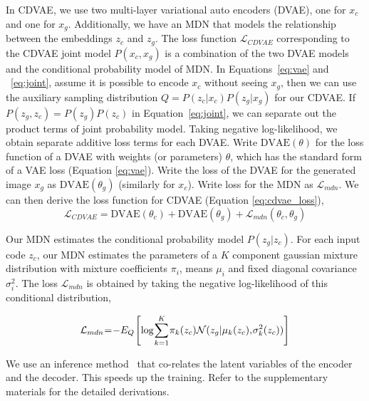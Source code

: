 \documentclass[10pt,twocolumn,letterpaper]{article}
\begin{document}
In CDVAE, we use two multi-layer variational auto encoders (DVAE), one for $x_c$ and one 
for $x_g$. Additionally, we have an MDN that models the relationship between the embeddings
$z_c$ and $z_g$. The loss function $\mathcal{L}_{CDVAE}$ corresponding to the CDVAE joint model $P(x_{c}, x_{g})$ 
is a combination of the two DVAE models and the conditional probability model of MDN. 
In Equations~\ref{eq:vae} and ~\ref{eq:joint}, 
assume it is possible to encode $x_c$ without seeing $x_g$, then we can use the auxiliary 
sampling distribution $Q=P(z_c|x_c)P(z_g|x_g)$ for our CDVAE. If $P(z_g, z_c)=P(z_g) P(z_c)$ 
in Equation~\ref{eq:joint}, we can separate out the product terms of joint probability 
model. Taking negative log-likelihood, we obtain separate additive loss terms for each 
DVAE. Write $\mbox{DVAE}(\theta)$ for the loss function of a DVAE with weights
(or parameters) $\theta$, which has the standard form of a VAE loss (Equation \ref{eq:vae}). 
Write the loss of the DVAE for the generated image $x_g$ as $\mbox{DVAE}(\theta_g)$ 
(similarly for $x_c$). Write loss for the MDN as $\mathcal{L}_{mdn}$. We can then derive the 
loss function for CDVAE (Equation \ref{eq:cdvae_loss}), 
\begin{equation}
\mathcal{L}_{CDVAE} =  \mbox{DVAE}(\theta_c) + \mbox{DVAE}(\theta_g) + \mathcal{L}_{mdn}(\theta_c, \theta_g)
\label{eq:cdvae_loss}
\end{equation}

Our MDN estimates the conditional probability model $P(z_{g} | z_{c})$. For each input code 
$z_c$, our MDN estimates the parameters of a $K$ component gaussian mixture distribution with 
mixture coefficients $\pi_i$, means $\mu_i$ and fixed diagonal covariance $\sigma_i^2$. The
loss $\mathcal{L}_{mdn}$ is obtained by taking the negative log-likelihood of this 
conditional distribution, 

\begin{equation}
\medmuskip=1mu
\thinmuskip=1mu
\thickmuskip=1mu
 \mathcal{L}_{mdn} = -E_{Q}\left[\log \sum_{k=1}^K \pi_k(z_c) \mathcal{N}(z_g|\mu_k(z_c), \sigma_k^2(z_c))\right]  
\end{equation}

We use an inference method~\cite{sonderby2016ladder} that co-relates the latent variables of 
the encoder and the decoder. This speeds up the training. Refer to the supplementary materials 
for the detailed derivations.
\end{document}
